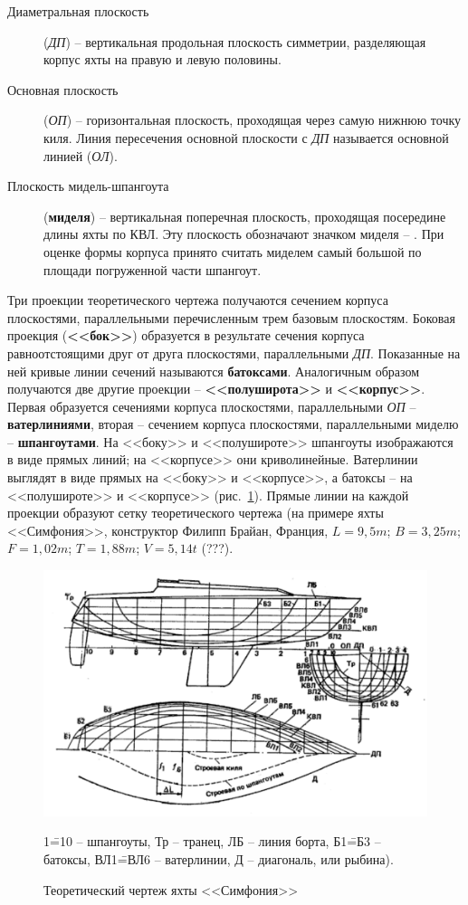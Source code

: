 \documentclass[a4paper, 12pt, twoside, final, book, russian, fittopage, cyremdash]{ncc}
\newcommand{\midelsign}{{\def\svgwidth{12pt}}\xspace}
\begin{document}
\begin{description}
\item [Диаметральная плоскость] (\textit{ДП}) \--- вертикальная продольная плоскость симметрии, разделяющая корпус яхты на правую и левую половины. 
\item [Основная плоскость] (\textit{ОП}) \--- горизонтальная плоскость, проходящая через самую нижнюю точку киля. Линия пересечения основной плоскости с \textit{ДП} называется основной линией (\textit{ОЛ}). 
\item [Плоскость мидель-шпангоута] (\textbf{миделя}) \--- вертикальная поперечная плоскость, проходящая посередине длины яхты по КВЛ. Эту плоскость обозначают значком миделя \--- \midelsign. При оценке формы корпуса принято считать миделем самый большой по площади погруженной части шпангоут. 
\end{description}

Три проекции теоретического чертежа получаются сечением корпуса плоскостями, параллельными перечисленным трем базовым плоскостям. Боковая проекция (\textbf{<<бок>>}) образуется в результате сечения корпуса равноотстоящими друг от друга плоскостями, параллельными \textit{ДП}. Показанные на ней кривые линии сечений называются \textbf{батоксами}. Аналогичным образом получаются две другие проекции \--- \textbf{<<полуширота>>} и \textbf{<<корпус>>}. Первая образуется сечениями корпуса плоскостями, параллельными \textit{ОП} \--- \textbf{ватерлиниями}, вторая \--- сечением корпуса плоскостями, параллельными миделю \--- \textbf{шпангоутами}. На <<боку>> и <<полушироте>> шпангоуты изображаются в виде прямых линий; на <<корпусе>> они криволинейные. Ватерлинии выглядят в виде прямых на <<боку>> и <<корпусе>>, а батоксы \--- на <<полушироте>> и <<корпусе>> (рис.~\ref{fig:2}). Прямые линии на каждой проекции образуют сетку теоретического чертежа (на примере яхты <<Симфония>>, конструктор Филипп Брайан, Франция, $L=9,5m$; $B=3,25m$; $F=1,02m$; $T=1,88m$; $V=5,14t$ (???).

\begin{figure}[htb]
   \centering
   \includegraphics{0002_Teor_chertezh}
   \caption{Теоретический чертеж яхты <<Симфония>>}
   \label{fig:2}
   \centering{}\small  1\==10 \--- шпангоуты, Тр \--- транец, ЛБ \--- линия борта, Б1\==Б3 \--- батоксы, ВЛ1\==ВЛ6 \--- ватерлинии, Д \--- диагональ, или рыбина).
\end{figure}
\end{document}
